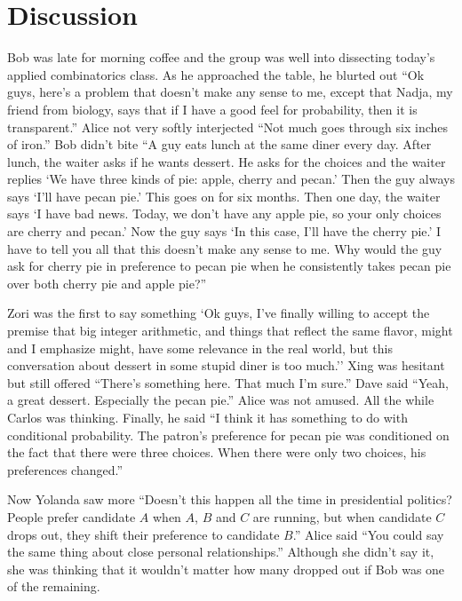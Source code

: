 \section{Discussion}\label{s:probability:discussion}

Bob was late for morning coffee and the group was
well into dissecting today's applied combinatorics class.
As he approached the table, he blurted out
``Ok guys, here's a problem that doesn't make any sense to
me, except that Nadja, my friend from biology, says that if I 
have a good feel for probability, then it is transparent.'' Alice not very
softly interjected ``Not much goes through six inches
of iron.'' Bob didn't bite ``A guy eats lunch
at the same diner every day.  After lunch, the waiter asks
if he wants dessert.  He asks for the choices and the waiter
replies `We have three kinds of pie: apple, cherry and pecan.'
Then the guy always says `I'll have pecan pie.'  This goes
on for six months.  Then one
day, the waiter says `I have bad news.  Today, we don't
have any apple pie, so your only choices are cherry and pecan.'
Now the guy says `In this case, I'll have the cherry pie.'  I
have to tell you all that this doesn't make any sense to me.
Why would the guy ask for cherry pie in preference to pecan
pie when he consistently takes pecan pie over both cherry
pie and apple pie?''

Zori was the first to say something `Ok guys, I've
finally willing to accept the premise that big integer arithmetic,
and things that reflect the same flavor, might and I emphasize
might, have some relevance in the real world, but this conversation
about dessert in some stupid diner is too much.''  Xing was 
hesitant but still offered ``There's something here. That much 
I'm sure.''  Dave said ``Yeah, a great dessert.  Especially 
the pecan pie.''  Alice was not amused.  All the while 
Carlos was thinking. Finally, he said ``I think it has 
something to do with conditional probability.  The patron's 
preference for pecan pie was conditioned on the
fact that there were three choices.  When there were only two
choices, his preferences changed.''

Now Yolanda saw more ``Doesn't this happen all the time in
presidential politics?  People prefer candidate $A$ when
$A$, $B$ and $C$ are running, but when candidate $C$ drops out,
they shift their preference to candidate $B$.''
Alice said ``You could say the same thing about close
personal relationships.''  Although she didn't say it,
she was thinking that it wouldn't matter how many dropped out
if Bob was one of the remaining.


